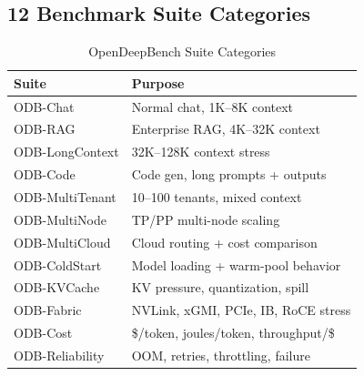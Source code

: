 \documentclass[conference,10pt]{IEEEtran}
\begin{document}
\subsection{12 Benchmark Suite Categories}

\begin{table}[!htbp]
\caption{OpenDeepBench Suite Categories}
\label{tab:suites}
\centering\footnotesize
\begin{tabular}{@{}lp{4.6cm}@{}}
\toprule
\textbf{Suite} & \textbf{Purpose} \\
\midrule
ODB-Chat & Normal chat, 1K--8K context \\
ODB-RAG & Enterprise RAG, 4K--32K context \\
ODB-LongContext & 32K--128K context stress \\
ODB-Code & Code gen, long prompts + outputs \\
ODB-MultiTenant & 10--100 tenants, mixed context \\
ODB-MultiNode & TP/PP multi-node scaling \\
ODB-MultiCloud & Cloud routing + cost comparison \\
ODB-ColdStart & Model loading + warm-pool behavior \\
ODB-KVCache & KV pressure, quantization, spill \\
ODB-Fabric & NVLink, xGMI, PCIe, IB, RoCE stress \\
ODB-Cost & \$/token, joules/token, throughput/\$ \\
ODB-Reliability & OOM, retries, throttling, failure \\
\bottomrule
\end{tabular}
\end{table}
\end{document}
